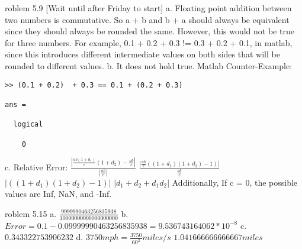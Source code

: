 \documentclass[12pt]{article}
\makeatletter
\theoremstyle{homework}
\newenvironment{exercise}[1]
{\def\@currentlabel{#1}\exercisecore}
{\endexercisecore}
\makeatother
\begin{document}
\begin{exercise} Problem 5.9 [Wait until after Friday to start]
\end{exercise}
a. Floating point addition between two numbers is commutative.
So a + b and b + a should always be equivalent since they should
always be rounded the same. However, this would not be true for three numbers.
For example, 0.1 + 0.2 + 0.3 != 0.3 + 0.2 + 0.1, in matlab, since this 
introduces different intermediate values on both sides that will be rounded
to different values.
\newline
\newline
b. It does not hold true.
\newline
Matlab Counter-Example:
\begin{verbatim}
>> (0.1 + 0.2)  + 0.3 == 0.1 + (0.2 + 0.3)

ans =

  logical

    0
\end{verbatim}
c. 
\newline
\newline
Relative Error:
\newline
$\frac{|\frac{ab(1+d_1)}{c}(1+d_2)-\frac{ab}{c}|}{|\frac{ab}{c}|}$
\newline   
$\frac{|\frac{ab}{c}((1+d_1)(1+d_2)-1)|}{\frac{ab}{c}}$
\newline
$|((1+d_1)(1+d_2)-1)|$
\newline
$|d_1 + d_2 + d_1d_2|$
\newline
\newline
Additionally, If c = 0, the possible values are Inf, NaN, and -Inf.


\begin{exercise} Problem 5.15
\end{exercise}
a. $\frac{9999990463256835938}{10000000000000000000}$
\newline
b. $Error = 0.1 - 0.09999990463256835938 = 9.536743164062 * 10^{-8}$
\newline
c. $0.343322753906232$
\newline
d. $3750mph = \frac{3750}{60^2}miles/s$
\newline
   $1.041666666666667 miles$
\end{document}
